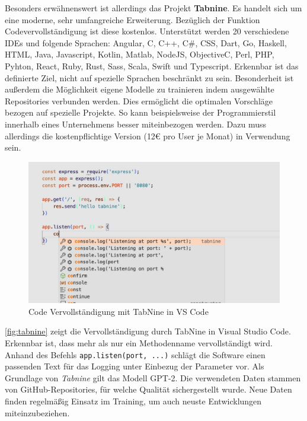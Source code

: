 Besonders erwähnenswert ist allerdings das Projekt \textbf{Tabnine}. Es handelt sich um eine moderne, sehr umfangreiche Erweiterung. Bezüglich der Funktion Codevervollständigung ist diese kostenlos. Unterstützt werden 20 verschiedene IDEs und folgende Sprachen: Angular, C, C++, C\#, CSS, Dart, Go, Haskell, HTML, Java, Javascript, Kotlin, Matlab, NodeJS, ObjectiveC, Perl, PHP, Pyhton, React, Ruby, Rust, Sass, Scala, Swift und Typescript. Erkennbar ist das definierte Ziel, nicht auf spezielle Sprachen beschränkt zu sein. Besonderheit ist außerdem die Möglichkeit eigene Modelle zu trainieren indem ausgewählte Repositories verbunden werden. Dies ermöglicht die optimalen Vorschläge bezogen auf spezielle Projekte. So kann beispielsweise der Programmierstil innerhalb eines Unternehmens besser miteinbezogen werden. Dazu muss allerdings die kostenpflichtige Version (12€ pro User je Monat) in Verwendung sein. 
\begin{figure}[!htb] 
	\centering
	\includegraphics[width=125mm]{images/tabnine.jpg}
	\caption{Code Vervollständigung mit TabNine in VS Code}
	\label{fig:tabnine}
\end{figure}
\FloatBarrier
\autoref{fig:tabnine} zeigt die Vervollständigung durch TabNine in Visual Studio Code. Erkennbar ist, dass mehr als nur ein Methodenname vervollständigt wird. Anhand des Befehls \lstinline|app.listen(port, ...)| schlägt die Software einen passenden Text für das Logging unter Einbezug der Parameter vor. Als Grundlage von \textit{Tabnine} gilt das Modell GPT-2. Die verwendeten Daten stammen von GitHub-Repositories, für welche Qualität sichergestellt wurde. Neue Daten finden regelmäßig Einsatz im Training, um auch neuste Entwicklungen miteinzubeziehen.